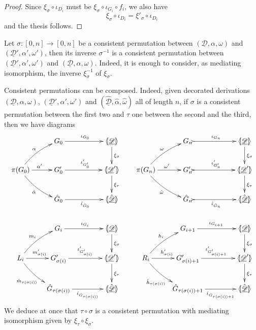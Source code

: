 \documentclass[a4paper,UKenglish,cleveref,pdftex, thm-restate,numberwithinsect]{lipics}
\newcommand{\dder}[1]{\mathscr{#1}}
\newcommand{\der}[1]{\underline{\dder{#1}}}
\newcommand{\lpro}{\langle \hspace{-1.85pt}[}
\newcommand{\rpro}{]\hspace{-1.85pt}\rangle}
\newcommand{\tpro}[1]{\lpro \der{#1}\rpro}
\begin{document}
\begin{proof}
	Since $\xi_\sigma \circ \iota_{D_i}$ must be $\xi_\sigma \circ \iota_{G_i}\circ f_i$, we also have
	\[\xi_\sigma \circ \iota_{D_i}=\xi'_\sigma \circ \iota_{D_i}\] 
and the thesis follows.
\end{proof}


\begin{remark}\label{rem:inversa}
Let $\sigma\colon [0,n]\to [0,n]$ be a consistent permutation between $(\der{D},\alpha, \omega)$ and $(\der{D}', \alpha', \omega')$, then its inverse $\sigma^{-1}$ is a consistent permutation between $(\der{D}', \alpha', \omega')$ and $(\der{D},\alpha, \omega)$. Indeed, it is enough to consider, as mediating isomorphism, the inverse $\xi^{-1}_\sigma$ of $\xi_\sigma$.
\end{remark}

\begin{remark}\label{rem:comp} Consistent permutations can be composed. Indeed, given decorated derivations $(\der{D}, \alpha, \omega)$, $(\der{D}', \alpha', \omega')$ and $(\der{\hat{D}}, \hat{\alpha}, \hat{\omega})$ all of length $n$, if $\sigma$ is a consistent permutation between the first two and $\tau$ one between the second and the third, then  we have diagrams
	\[\xymatrix@C=18pt{ & G_0 \ar[rr]^{\iota_{G_0}} &&\tpro{D} \ar[d]^{\xi_\sigma}&  &  G_{n} \ar@{>->}[rr]^{\iota_{ G_{n}}} &&\tpro{D} \ar[d]^{\xi_\sigma} \\ \pi(G_0) \ar@/_.2cm/[dr]_{\hat{\alpha}}\ar@/^.2cm/[ur]^{\alpha} \ar[r]^{\alpha'} &G'_0 \ar[rr]^{\iota'_{G'_0}}  &&\lpro \der{D}'  \rpro \ar[d]^{\xi_{\tau}}&\pi({ G_{n}})\ar@/_.2cm/[dr]_{\hat{\omega}}\ar@/^.2cm/[ur]^{\omega} \ar[r]^{\omega'} & { G'_{n}} \ar@{>->}[rr]^{\iota'_{{ G'_{n}}}} && \lpro \der{D}' \rpro \ar[d]^{\xi_{\tau}}\\ &\hat{G}_0  \ar[rr]_{\hat{\iota}_{\hat{G}_0}}&& \lpro \hat{\der{D}}\rpro  && \hat{G}_n \ar@{>->}[rr]_{\hat{\iota}_{\hat{G}_n}}&& \lpro \hat{\der{D}} \rpro \\& G_i \ar[rr]^{\iota_{G_i}} &&\tpro{D} \ar[d]^{\xi_\sigma}&  &  G_{i+1} \ar[rr]^{\iota_{G_{i+1}}} &&\tpro{D} \ar[d]^{\xi_\sigma} \\ L_i \ar@/_.2cm/[dr]_{\hat{m}_{\tau(\sigma(i))}}\ar@/^.2cm/[ur]^{m_i} \ar[r]^{m'_{\sigma(i)}} &G'_{\sigma(i)} \ar[rr]^{\iota'_{G'_{\sigma(i)}}}  &&\lpro \der{D}'  \rpro \ar[d]^{\xi_{\tau}}&R_i \ar@/_.2cm/[dr]_{\hat{h}_{\tau(\sigma(i))}}\ar@/^.2cm/[ur]^{h_i} \ar[r]^{h'_{\sigma(i)}} & G'_{\sigma(i)+1} \ar[rr]^{\iota'_{G'_{\sigma(i)+1}}} && \lpro \der{D}' \rpro \ar[d]^{\xi_{\tau}}\\ &\hat{G}_{\tau(\sigma(i))}  \ar[rr]_-{\hat{\iota}_{\hat{G}_{\tau(\sigma(i))}}}&& \lpro \hat{\der{D}}\rpro  && \hat{G}_{\tau(\sigma(i))+1} \ar[rr]_-{\hat{\iota}_{\hat{G}_{\tau(\sigma(i))+1}}}&& \lpro \hat{\der{D}} \rpro	}\]
	We deduce at once that $\tau\circ \sigma$ is a consistent permutation with mediating isomorphism given by $\xi_{\tau} \circ \xi_\sigma$.
\end{remark}
\end{document}
